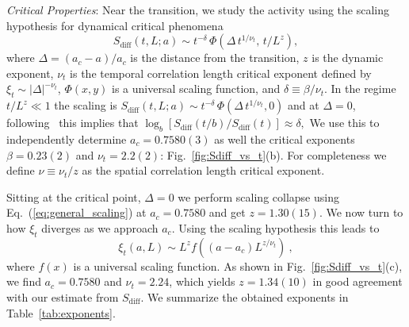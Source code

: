 \documentclass[twocolumn,amsmath,amssymb,floatfix,superscriptaddress,aps,prl]{revtex4-2}
\begin{document}
{\it Critical Properties}:
Near the transition, %
we study the activity  using the scaling hypothesis for dynamical critical phenomena~\cite{goldenfeld2018lectures}  
\begin{equation}
    S_{\mathrm{diff}}(t,L; a) \sim t^{-\delta}\, \Phi\left(\Delta\, t^{1/\nu_t},\, t/L^z\right),
    \label{eq:general_scaling}
\end{equation}
where $\Delta = (a_c - a)/a_c$ is the distance from the transition, $z$ is the dynamic exponent, $\nu_t$ is the  temporal correlation length critical exponent defined by $\xi_t\sim |\Delta|^{-\nu_t}$, $\Phi(x,y)$ is a universal scaling function, and 
$\delta \equiv \beta/\nu_t$. In the regime $t/L^z \ll 1$ the scaling is %
$
    S_{\mathrm{diff}}(t, L; a) \sim t^{-\delta}\, \Phi\left(\Delta\, t^{1/\nu_t},0\right)
    $
and at $\Delta=0$, following~\cite{mendonca2011monte} this implies  that
$    \log_b\left[
S_{\mathrm{diff}}(t/b)/S_{\mathrm{diff}}(t)
\right] \approx \delta,
$
%
We use this to independently determine $a_c = 0.7580(3)$ as well the critical exponents $\beta = 0.23(2)$ and $\nu_t = 2.2(2)$: Fig.~\ref{fig:Sdiff_vs_t}(b). %
For completeness we define $\nu \equiv \nu_t/z$ as the spatial correlation length critical exponent.


Sitting at the critical point, $\Delta=0$ we  perform scaling collapse using Eq.~(\ref{eq:general_scaling}) at $a_c=0.7580$ and get $z = 1.30(15)$. 
We now turn to how $\xi_t$ diverges as we approach $a_c$. Using the scaling hypothesis this leads to 
\begin{equation}
    \xi_t(a,L)\sim L^z f((a-a_c)L^{z/\nu_t})~,
    \label{eq:xi-scaling}
\end{equation}
where $f(x)$ is a universal scaling function.
As shown in Fig.~\ref{fig:Sdiff_vs_t}(c), we find $a_c = 0.7580$ and $\nu_t = 2.24$, which yields $z=1.34(10)$ in good agreement with our estimate from $S_{\mathrm{diff}}$.  We summarize the obtained exponents in Table~\ref{tab:exponents}.



\end{document}

